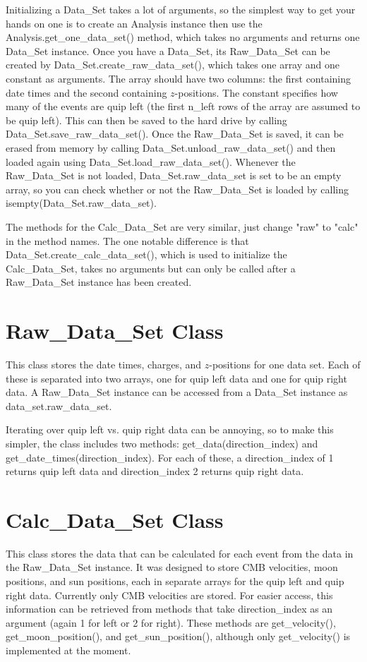 \documentclass[12pt]{report}
\begin{document}
Initializing a Data\_Set takes a lot of arguments, so the simplest way to get your hands on one is to create an Analysis instance then use the Analysis.get\_one\_data\_set() method, which takes no arguments and returns one Data\_Set instance.  Once you have a Data\_Set, its Raw\_Data\_Set can be created by Data\_Set.create\_raw\_data\_set(), which takes one array  and one constant as arguments.  The array should have two columns: the first containing date times and the second containing $z$-positions.  The constant specifies how many of the events are quip left (the first n\_left rows of the array are assumed to be quip left).  This can then be saved to the hard drive by calling Data\_Set.save\_raw\_data\_set().  Once the Raw\_Data\_Set is saved, it can be erased from memory by calling Data\_Set.unload\_raw\_data\_set() and then loaded again using Data\_Set.load\_raw\_data\_set().  Whenever the Raw\_Data\_Set is not loaded, Data\_Set.raw\_data\_set is set to be an empty array, so you can check whether or not the Raw\_Data\_Set is loaded by calling isempty(Data\_Set.raw\_data\_set).

The methods for the Calc\_Data\_Set are very similar, just change "raw" to "calc" in the method names.  The one notable difference is that Data\_Set.create\_calc\_data\_set(), which is used to initialize the Calc\_Data\_Set, takes no arguments but can only be called after a Raw\_Data\_Set instance has been created.

\section{Raw\_Data\_Set Class}
This class stores the date times, charges, and $z$-positions for one data set.  Each of these is separated into two arrays, one for quip left data and one for quip right data.  A Raw\_Data\_Set instance can be accessed from a Data\_Set instance as data\_set.raw\_data\_set.

Iterating over quip left vs. quip right data can be annoying, so to make this simpler, the class includes two methods: get\_data(direction\_index) and get\_date\_times(direction\_index).  For each of these, a direction\_index of 1 returns quip left data and direction\_index 2 returns quip right data.

\section{Calc\_Data\_Set Class}
This class stores the data that can be calculated for each event from the data in the Raw\_Data\_Set instance.  It was designed to store CMB velocities, moon positions, and sun positions, each in separate arrays for the quip left and quip right data.  Currently only CMB velocities are stored.  For easier access, this information can be retrieved from methods that take direction\_index as an argument (again 1 for left or 2 for right).  These methods are get\_velocity(), get\_moon\_position(), and get\_sun\_position(), although only get\_velocity() is implemented at the moment.
\end{document}
